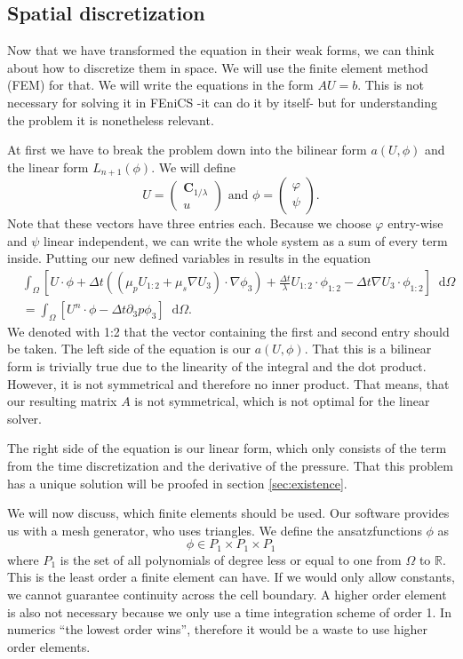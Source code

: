 \documentclass[12pt,a4paper,twoside, open=right]{scrreprt}
\theoremstyle{definition}
\theoremstyle{plain}
\newcommand{\rr}{\mathbb{R}}
\newcommand{\bfC}{\bm{C}}
\newcommand{\D}{\mathop{}\!\mathrm{d}}
\begin{document}
\subsection{Spatial discretization}
Now that we have transformed the equation in their weak forms, we can think about how to discretize them in space. We will use the finite element method (FEM) for that. We will write the equations in the form $AU=b$. This is not necessary for solving it in FEniCS -it can do it by itself- but for understanding the problem it is nonetheless relevant. 
\par 
At first we have to break the problem down into the bilinear form $a(U,\phi)$ and the linear form $L_{n+1}(\phi)$. We will define 
\begin{equation}
   U=\begin{pmatrix}
   \bfC_{1/\lambda}\\u
   \end{pmatrix} \text{ and } 
   \phi=\begin{pmatrix}
   \varphi\\\psi
   \end{pmatrix}.
\end{equation}
Note that these vectors have three entries each. Because we choose $\varphi$ entry-wise and $\psi$ linear independent, we can write the whole system as a sum of every term inside. Putting our new defined variables in results in the equation
\begin{align}
\label{eq:sumcon}
    &\int_\Omega[U\cdot\phi+\Delta t((\mu_pU_{1:2}+\mu_s\nabla U_3)\cdot\nabla\phi_3)+\frac{\Delta t}{\lambda}U_{1:2}\cdot\phi_{1:2}-\Delta t\nabla U_3\cdot\phi_{1:2}]\D\Omega\\
    &=\int_\Omega [U^n\cdot\phi-\Delta t\partial_3 p\phi_3]\D\Omega.
\end{align}
We denoted with 1:2 that the vector containing the first and second entry should be taken. The left side of the equation is our $a(U,\phi)$. That this is a bilinear form is trivially true due to the linearity of the integral and the dot product. However, it is not symmetrical and therefore no inner product. That means, that our resulting matrix $A$ is not symmetrical, which is not optimal for the linear solver.\par 
The right side of the equation is our linear form, which only consists of the term from the time discretization and the derivative of the pressure. That this problem has a unique solution will be proofed in section \ref{sec:existence}. \par 
We will now discuss, which finite elements should be used. Our software provides us with a mesh generator, who uses triangles. We define the ansatzfunctions $\phi$ as
\begin{equation}
    \phi\in P_1\times P_1\times P_1
\end{equation}
where $P_1$ is the set of all polynomials of degree less or equal to one from $\Omega$ to $\rr$. This is the least order a finite element can have. If we would only allow constants, we cannot guarantee continuity across the cell boundary. A higher order element is also not necessary because we only use a time integration scheme of order 1. In numerics \enquote{the lowest order wins}, therefore it would be a waste to use higher order elements.
\end{document}
